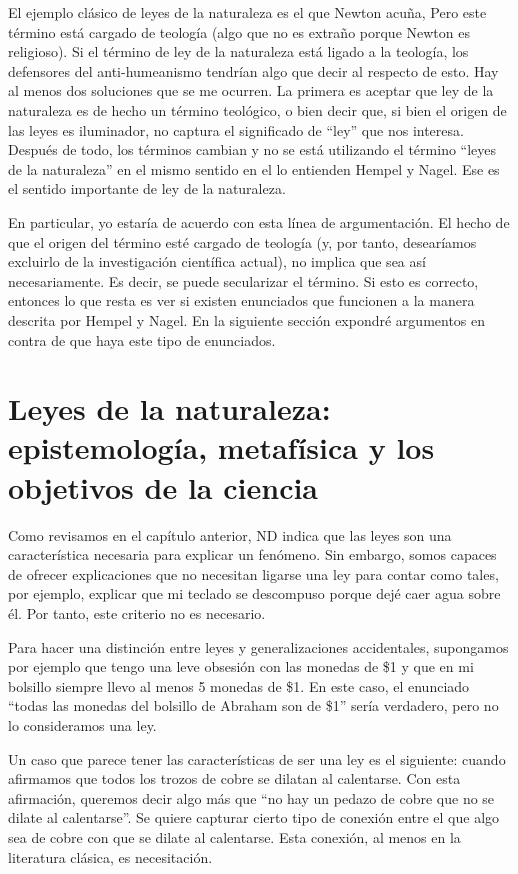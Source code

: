 El ejemplo clásico de leyes de la naturaleza es el que Newton acuña, Pero este término está cargado de teología (algo que no es extraño porque Newton es religioso). Si el término de ley de la naturaleza está ligado a la teología, los defensores del anti-humeanismo tendrían algo que decir al respecto de esto. Hay al menos dos soluciones que se me ocurren. La primera es aceptar que ley de la naturaleza es de hecho un término teológico, o bien decir que, si bien el origen de las leyes es iluminador, no captura el significado de ``ley'' que nos interesa. Después de todo, los términos cambian y no se está utilizando el término ``leyes de la naturaleza'' en el mismo sentido en el lo entienden Hempel y Nagel. Ese es el sentido importante de ley de la naturaleza.

En particular, yo estaría de acuerdo con esta línea de argumentación. El hecho de que el origen del término esté cargado de teología (y, por tanto, desearíamos excluirlo de la investigación científica actual), no implica que sea así necesariamente. Es decir, se puede secularizar el término. Si esto es correcto, entonces lo que resta es ver si existen enunciados que funcionen a la manera descrita por Hempel y Nagel. En la siguiente sección expondré argumentos en contra de que haya este tipo de enunciados.

\section{Leyes de la naturaleza: epistemología, metafísica y los objetivos de la ciencia}

\noindent Como revisamos en el capítulo anterior, ND indica que las leyes son una característica necesaria para explicar un fenómeno. Sin embargo, somos capaces de ofrecer explicaciones que no necesitan ligarse una ley para contar como tales, por ejemplo, explicar que mi teclado se descompuso porque dejé caer agua sobre él. Por tanto, este criterio no es necesario.

Para hacer una distinción entre leyes y generalizaciones accidentales, supongamos por ejemplo que tengo una leve obsesión con las monedas de \$1 y que en mi bolsillo siempre llevo al menos 5 monedas de \$1. En este caso, el enunciado ``todas las monedas del bolsillo de Abraham son de \$1'' sería verdadero, pero no lo consideramos una ley.

Un caso que parece tener las características de ser una ley es el siguiente: cuando afirmamos que todos los trozos de cobre se dilatan al calentarse.  Con esta afirmación, queremos decir algo más que ``no hay un pedazo de cobre que no se dilate al calentarse''. Se quiere capturar cierto tipo de conexión entre el que algo sea de cobre con que se dilate al calentarse. Esta conexión, al menos en la literatura clásica, es necesitación.


